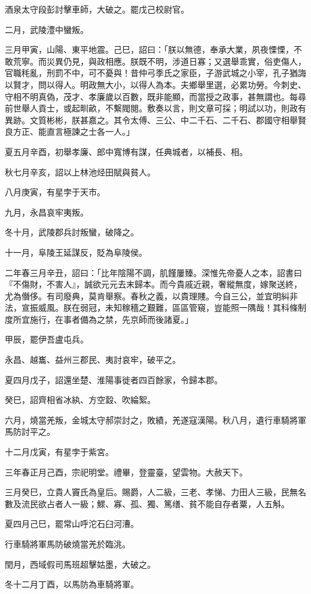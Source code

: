 \begin{pinyinscope}
酒泉太守段彭討擊車師，大破之。罷戊己校尉官。

二月，武陵澧中蠻叛。

三月甲寅，山陽、東平地震。己巳，詔曰：「朕以無德，奉承大業，夙夜慄慄，不敢荒寧。而災異仍見，與政相應。朕既不明，涉道日寡；又選舉乖實，俗吏傷人，官職秏亂，刑罰不中，可不憂與！昔仲弓季氏之家臣，子游武城之小宰，孔子猶誨以賢才，問以得人。明政無大小，以得人為本。夫鄉舉里選，必累功勞。今刺史、守相不明真偽，茂才、孝廉歲以百數，既非能顯，而當授之政事，甚無謂也。每尋前世舉人貢士，或起甽畝，不繫閥閱。敷奏以言，則文章可採；明試以功，則政有異跡。文質彬彬，朕甚嘉之。其令太傅、三公、中二千石、二千石、郡國守相舉賢良方正、能直言極諫之士各一人。」

夏五月辛酉，初舉孝廉、郎中寬博有謀，任典城者，以補長、相。

秋七月辛亥，詔以上林池烃田賦與貧人。

八月庚寅，有星孛于天市。

九月，永昌哀牢夷叛。

冬十月，武陵郡兵討叛蠻，破降之。

十一月，阜陵王延謀反，貶為阜陵侯。

二年春三月辛丑，詔曰：「比年陰陽不調，肌饉屢臻。深惟先帝憂人之本，詔書曰『不傷財，不害人』，誠欲元元去末歸本。而今貴戚近親，奢縱無度，嫁聚送終，尤為僭侈。有司廢典，莫肯舉察。春秋之義，以貴理賤。今自三公，並宜明糾非法，宣振威風。朕在弱冠，未知稼穡之艱難，區區管窺，豈能照一隅哉！其科條制度所宜施行，在事者備為之禁，先京師而後諸夏。」

甲辰，罷伊吾盧屯兵。

永昌、越巂、益州三郡民、夷討哀牢，破平之。

夏四月戊子，詔還坐楚、淮陽事徙者四百餘家，令歸本郡。

癸巳，詔齊相省冰紈、方空縠、吹綸絮。

六月，燒當羌叛，金城太守郝崇討之，敗績，羌遂寇漢陽。秋八月，遺行車騎將軍馬防討平之。

十二月戊寅，有星孛于紫宮。

三年春正月己酉，宗祀明堂。禮畢，登靈臺，望雲物。大赦天下。

三月癸巳，立貴人竇氏為皇后。賜爵，人二級，三老、孝悌、力田人三級，民無名數及流民欲占者人一級；鰥、寡、孤、獨、篤缮、貧不能自存者粟，人五斛。

夏四月己巳，罷常山呼沱石臼河漕。

行車騎將軍馬防破燒當羌於臨洮。

閏月，西域假司馬班超擊姑墨，大破之。

冬十二月丁酉，以馬防為車騎將軍。


\end{pinyinscope}
